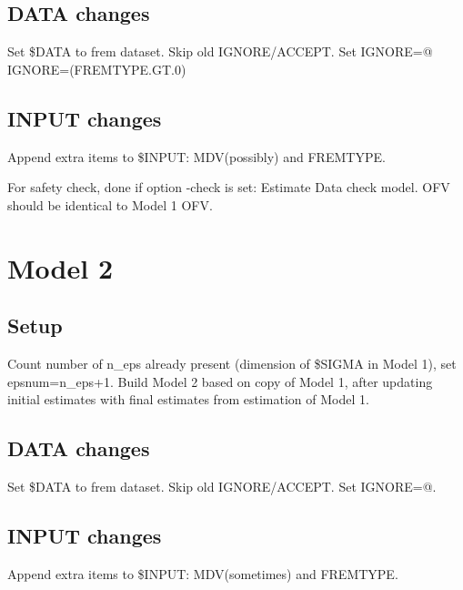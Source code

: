 \subsection{DATA changes}
Set \$DATA to frem dataset. Skip old IGNORE/ACCEPT. Set IGNORE=@ IGNORE=(FREMTYPE.GT.0)

\subsection{INPUT changes}
Append extra items to \$INPUT: MDV(possibly) and FREMTYPE.

For safety check, done if option -check is set: Estimate Data check model. OFV should be identical to Model 1 OFV.


\section{Model 2}



\subsection{Setup}
Count number of n\_eps already present (dimension of \$SIGMA in Model 1), set epsnum=n\_eps+1.
Build Model 2 based on copy of Model 1, after updating initial estimates with final estimates
from estimation of Model 1.

\subsection{DATA changes}
Set \$DATA to frem dataset. Skip old IGNORE/ACCEPT. Set IGNORE=@.

\subsection{INPUT changes}
Append extra items to \$INPUT: MDV(sometimes) and FREMTYPE.

